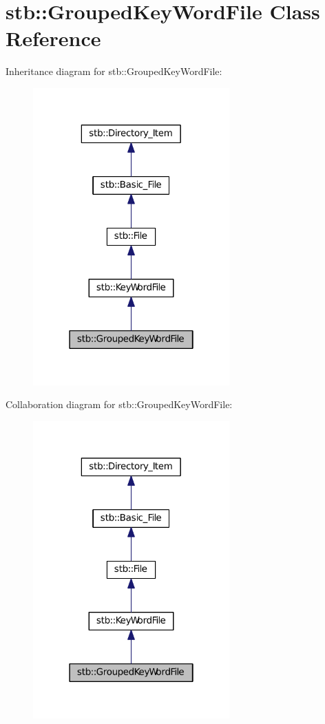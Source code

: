 \hypertarget{classstb_1_1GroupedKeyWordFile}{\section{stb\+:\+:Grouped\+Key\+Word\+File Class Reference}
\label{classstb_1_1GroupedKeyWordFile}
}


Inheritance diagram for stb\+:\+:Grouped\+Key\+Word\+File\+:
\nopagebreak
\begin{figure}[H]
\begin{center}
\leavevmode
\includegraphics[width=214pt]{classstb_1_1GroupedKeyWordFile__inherit__graph}
\end{center}
\end{figure}


Collaboration diagram for stb\+:\+:Grouped\+Key\+Word\+File\+:
\nopagebreak
\begin{figure}[H]
\begin{center}
\leavevmode
\includegraphics[width=214pt]{classstb_1_1GroupedKeyWordFile__coll__graph}
\end{center}
\end{figure}
